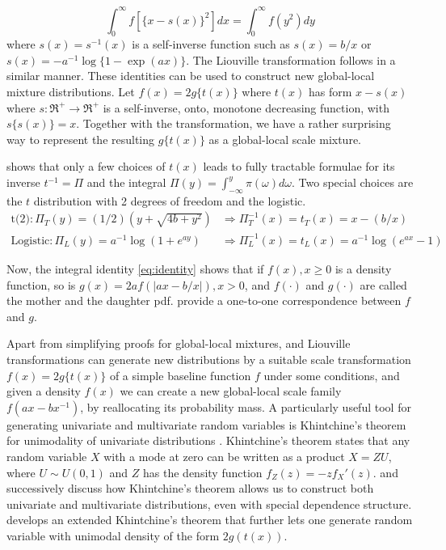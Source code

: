 \documentclass[lineno]{biometrika}
\begin{document}
\begin{equation}
  \int_0^\infty f \left[ \{x-s(x)\}^2 \right] dx = \int_0^\infty f( y^2 ) dy \label{eq:gen}
\end{equation}
where $s(x)=s^{-1}(x)$ is a self-inverse function such as $s(x) = b/x$ or $s(x) = -a^{-1}\log\{1-\exp(a x)\}$. The Liouville transformation follows in a similar manner. %
These identities can be used to construct new global-local mixture distributions. Let $f(x) = 2g\{ t(x) \}$ where $t(x)$ has form $x-s(x)$ where $s : \Re^+ \to \Re^+$ is a self-inverse, onto, monotone decreasing function, with $s\{ s(x)\} = x$. Together with the \CS transformation, we have a rather surprising way to represent the resulting $g\{t(x)\}$ as a global-local scale mixture. 

\citet{jones2014generating} shows that only a few choices of $t(x)$ leads to fully tractable formulae for its inverse $t^{-1}= \Pi$ and the integral $\Pi(y) = \int_{-\infty}^{y} \pi(\omega) d\omega$. Two special choices are the $t$ distribution with 2 degrees of freedom and the logistic. 
\begin{align*}
\mbox{t(2)}: \Pi_{T}(y) = (1/2)(y+\sqrt{4b+y^2}) & \Rightarrow \Pi_T^{-1}(x) = t_T(x) = x - (b/x) \\
\mbox{Logistic}: \Pi_{L}(y) = a^{-1} \log(1+e^{ay}) & \Rightarrow \Pi_L^{-1}(x) = t_L(x) = a^{-1} \log(e^{ax}-1) 
\end{align*}

Now, the integral identity \eqref{eq:identity} shows that if $f(x), x \geq 0$ is a density function, so is $g(x) = 2a f(|ax-b/x|), x >0$, and $f(\cdot)$ and $g(\cdot)$ are called the mother and the daughter pdf. \citet{chaubey2010reciprocal} provide a one-to-one correspondence between $f$ and $g$. 

Apart from simplifying proofs for  global-local mixtures, \CS and Liouville transformations can generate new distributions by a suitable scale transformation $f(x) = 2g\{ t(x) \}$ of a simple baseline function $f$ under some conditions, and given a density $f(x)$ we can create a new global-local scale family $f(ax-bx^{-1})$, by reallocating its probability mass. A particularly useful tool for generating univariate and multivariate random variables is Khintchine's theorem for unimodality of univariate distributions \citep{bryson1982constructing}. Khintchine's theorem states that any random variable $X$ with a mode at zero can be written as a product $X = ZU$, where $U \sim U(0,1)$ and $Z$ has the density function $f_Z(z) = -zf_{X}'(z)$. \citet{bryson1982constructing} and successively \citet{jones2012khintchine} discuss how Khintchine's theorem allows us to construct both univariate and multivariate distributions, even with special dependence structure.\cite{jones2014generating} develops an extended Khintchine's theorem that further lets one generate random variable with unimodal density of the form $2g(t(x))$. 
\end{document}
